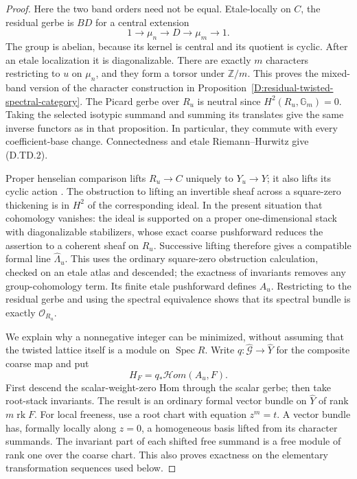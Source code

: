 \begin{proof}
Here the two band orders need not be equal. Etale-locally on $C$,
the residual gerbe is $BD$ for a central extension
\[
                 1\longrightarrow\mu_n\longrightarrow D
                    \longrightarrow\mu_m\longrightarrow1.
                                                               \tag{D.TD.4}
\]
The group is abelian, because its kernel is central and its
quotient is cyclic. After an etale localization it is
diagonalizable. There are exactly $m$ characters restricting to
$u$ on $\mu_n$, and they form a torsor under $\mathbb Z/m$.
This proves the mixed-band version of the character construction
in Proposition~\ref{D:residual-twisted-spectral-category}.
The Picard gerbe over $R_u$ is neutral since
$H^2(R_u,\mathbb G_m)=0$. Taking the selected isotypic summand
and summing its translates give the same inverse functors as in
that proposition. In particular, they commute with every
coefficient-base change. Connectedness and etale Riemann--Hurwitz
give (D.TD.2).

Proper henselian comparison lifts $R_u\to C$ uniquely to
$Y_u\to Y$; it also lifts its cyclic action
\citep[Lemma 58.9.1, Tag 0A48, complete proof]{StacksSingleCurveBrauerD}.
The obstruction to lifting an invertible sheaf across a
square-zero thickening is in $H^2$ of the corresponding ideal.
In the present situation that cohomology vanishes: the ideal is
supported on a proper one-dimensional stack with diagonalizable
stabilizers, whose exact coarse pushforward reduces the assertion
to a coherent sheaf on $R_u$. Successive lifting therefore gives
a compatible formal line $\widehat\Lambda_u$. This uses the
ordinary square-zero obstruction calculation, checked on an
etale atlas and descended; the exactness of invariants removes
any group-cohomology term. Its finite etale pushforward defines
$A_u$. Restricting to the residual gerbe and using the spectral
equivalence shows that its spectral bundle is exactly
$\mathcal O_{R_u}$.

We explain why a nonnegative integer can be minimized, without
assuming that the twisted lattice itself is a module on
$\operatorname{Spec}R$. Write $q:\widehat{\mathcal G}\to\widehat Y$
for the composite coarse map and put
\[
                        H_F=q_*\mathcal Hom(A_u,F).
                                                               \tag{D.TD.5}
\]
First descend the scalar-weight-zero Hom through the scalar gerbe;
then take root-stack invariants. The result is an ordinary formal
vector bundle on $\widehat Y$ of rank $m\operatorname{rk}F$.
For local freeness, use a root chart with equation $z^m=t$.
A vector bundle has, formally locally along $z=0$, a homogeneous
basis lifted from its character summands. The invariant part of
each shifted free summand is a free module of rank one over the
coarse chart. This also proves exactness on the elementary
transformation sequences used below.


\end{proof}

